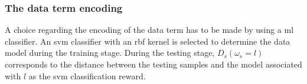 \subsubsection{The data term encoding}

 A choice regarding the encoding of the data term has to be made by using a \ac{ml} classifier. An \ac{svm} classifier  with an \ac{rbf} kernel is selected to determine the data model during the training stage. During the testing stage, $D_s(\omega_s=l)$ corresponds to the distance between the testing samples and the model associated with $l$ as the \ac{svm} classification reward. 

